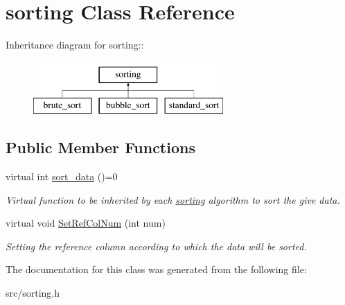 \hypertarget{classsorting}{
\section{sorting Class Reference}
\label{df/d42/classsorting}
}
Inheritance diagram for sorting::\begin{figure}[H]
\begin{center}
\leavevmode
\includegraphics[height=2cm]{df/d42/classsorting}
\end{center}
\end{figure}
\subsection*{Public Member Functions}
\begin{DoxyCompactItemize}
\item 
\hypertarget{classsorting_a94c4b729732743299f3dcd2505312381}{
virtual int \hyperlink{classsorting_a94c4b729732743299f3dcd2505312381}{sort\_\-data} ()=0}
\label{df/d42/classsorting_a94c4b729732743299f3dcd2505312381}

\begin{DoxyCompactList}\small\item\em Virtual function to be inherited by each \hyperlink{classsorting}{sorting} algorithm to sort the give data. \item\end{DoxyCompactList}\item 
\hypertarget{classsorting_aee6e7f2f0ea31873c500e0692e4fc00c}{
virtual void \hyperlink{classsorting_aee6e7f2f0ea31873c500e0692e4fc00c}{SetRefColNum} (int num)}
\label{df/d42/classsorting_aee6e7f2f0ea31873c500e0692e4fc00c}

\begin{DoxyCompactList}\small\item\em Setting the reference column according to which the data will be sorted. \item\end{DoxyCompactList}\end{DoxyCompactItemize}


The documentation for this class was generated from the following file:\begin{DoxyCompactItemize}
\item 
src/sorting.h\end{DoxyCompactItemize}
